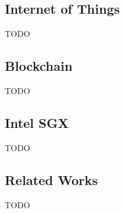 \subsection{Internet of Things}
TODO

\subsection{Blockchain}
TODO

\subsection{Intel SGX}
TODO

\subsection{Related Works}
TODO